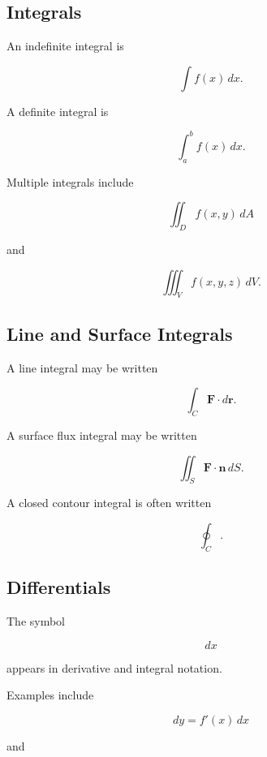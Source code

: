\subsection{Integrals}
\label{subsec:integral-notation-reference}

An indefinite integral is

\[
\boxed{
\int f(x)\,dx.
}
\]

A definite integral is

\[
\boxed{
\int_a^bf(x)\,dx.
}
\]

Multiple integrals include

\[
\boxed{
\iint_Df(x,y)\,dA
}
\]

and

\[
\boxed{
\iiint_Vf(x,y,z)\,dV.
}
\]

\subsection{Line and Surface Integrals}
\label{subsec:line-surface-integral-notation}

A line integral may be written

\[
\boxed{
\int_C
\mathbf{F}\cdot d\mathbf{r}.
}
\]

A surface flux integral may be written

\[
\boxed{
\iint_S
\mathbf{F}\cdot\mathbf{n}\,dS.
}
\]

A closed contour integral is often written

\[
\boxed{
\oint_C.
}
\]

\subsection{Differentials}
\label{subsec:differential-symbol-reference}

The symbol

\[
\boxed{
dx
}
\]

appears in derivative and integral notation.

Examples include

\[
\boxed{
dy
=
f'(x)\,dx
}
\]

and

